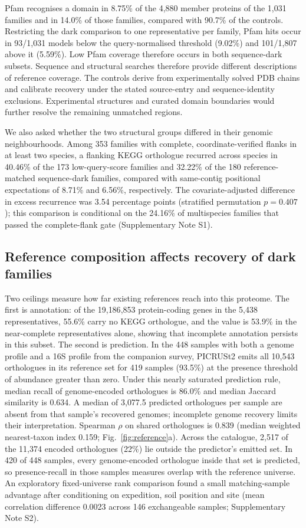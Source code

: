 \documentclass[11pt]{article}
\begin{document}
Pfam recognises a domain in 8.75\% of the 4{,}880 member proteins of the 1{,}031 families and
in 14.0\% of those families, compared with 90.7\% of the controls. Restricting the dark comparison to one representative per family, Pfam hits occur in 93/1{,}031 models below the query-normalised threshold (9.02\%) and 101/1{,}807 above it (5.59\%). Low Pfam coverage therefore occurs in both sequence-dark subsets. Sequence and structural
searches therefore provide different descriptions of reference coverage. The controls derive from experimentally solved PDB chains and calibrate recovery under the stated source-entry and sequence-identity exclusions. Experimental structures and curated domain boundaries would further resolve the remaining unmatched regions.


We also asked whether the two structural groups differed in their genomic neighbourhoods.
Among 353 families with complete, coordinate-verified flanks in at least two species,
a flanking KEGG orthologue recurred across species in 40.46\% of the 173 low-query-score families
and 32.22\% of the 180 reference-matched sequence-dark families, compared with same-contig
positional expectations of 8.71\% and 6.56\%, respectively. The covariate-adjusted difference
in excess recurrence was 3.54 percentage points (stratified permutation $p=0.407$);
this comparison is conditional on the 24.16\% of multispecies families that passed the complete-flank
gate (Supplementary Note S1).

\subsection*{Reference composition affects recovery of dark families}

Two ceilings measure how far existing references reach into this proteome. The first is
annotation: of the 19{,}186{,}853 protein-coding genes in the 5{,}438 representatives, 55.6\% carry
no KEGG orthologue, and the value is 53.9\% in the near-complete representatives alone, showing that incomplete annotation persists in this subset. The second is prediction. In the 448
samples with both a genome profile and a 16S profile from the companion survey, PICRUSt2
emits all 10{,}543 orthologues in its reference set for 419 samples (93.5\%) at the presence
threshold of abundance greater than zero. Under this nearly saturated prediction rule,
median recall of genome-encoded orthologues is 86.0\% and median Jaccard similarity is 0.634.
A median of 3{,}077.5 predicted orthologues per sample are absent from that sample's recovered
genomes; incomplete genome recovery limits their interpretation. Spearman $\rho$ on shared
orthologues is 0.839 (median weighted nearest-taxon index 0.159; Fig.~\ref{fig:reference}a).
Across the catalogue, 2{,}517 of the 11{,}374 encoded orthologues (22\%) lie outside the predictor's
emitted set. In 420 of 448 samples, every genome-encoded orthologue inside that set is predicted,
so presence-recall in those samples measures overlap with the reference universe.
An exploratory fixed-universe rank comparison found a small matching-sample advantage after conditioning on expedition, soil position and site (mean correlation difference 0.0023 across 146 exchangeable samples; Supplementary Note S2).
\end{document}
